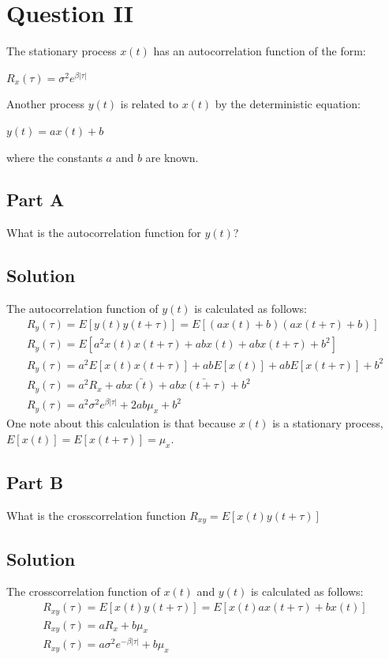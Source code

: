 \documentclass{article}
\begin{document}
\section*{Question II}
The stationary process $x(t)$ has an autocorrelation function of the form:
\begin{center}
    $R_x(\tau) = \sigma^2 e^{\beta |\tau|}$
\end{center}
Another process $y(t)$ is related to $x(t)$ by the deterministic equation:
\begin{center}
    $y(t) = ax(t) + b$
\end{center}
where the constants $a$ and $b$ are known.
\subsection*{Part A}
What is the autocorrelation function for $y(t)$?
\subsection*{Solution}
The autocorrelation function of $y(t)$ is calculated as follows:
\begin{gather*}
    R_y(\tau) = E\left[y(t)y(t + \tau)\right] = E\left[(ax(t)+b)(ax(t+\tau)+b)\right] \\
    R_y(\tau) = E\left[a^2x(t)x(t+\tau) + abx(t) + abx(t+\tau) + b^2\right] \\
    R_y(\tau) = a^2E\left[x(t)x(t+\tau)\right] + abE\left[x(t)\right] + abE\left[x(t+\tau)\right] + b^2 \\
    R_y(\tau) = a^2R_x + ab\bar{x(t)} + ab\bar{x(t+\tau)} + b^2 \\
    R_y(\tau) = a^2\sigma^2e^{\beta|\tau|} + 2ab\mu_x + b^2
\end{gather*}
One note about this calculation is that because $x(t)$ is a stationary process, $E\left[x(t)\right] = E\left[x(t+\tau)\right] = \mu_x$.

\subsection*{Part B}
What is the crosscorrelation function $R_{xy} = E\left[x(t)y(t+\tau)\right]$
\subsection*{Solution}
The crosscorrelation function of $x(t)$ and $y(t)$ is calculated as follows:
\begin{gather*}
    R_{xy}(\tau) = E\left[x(t)y(t+\tau)\right] = E\left[x(t)ax(t+\tau) + bx(t)\right] \\
    R_{xy}(\tau) = aR_x + b\mu_x \\
    R_{xy}(\tau) = a\sigma^2e^{-\beta|\tau|} + b\mu_x
\end{gather*}
\end{document}
